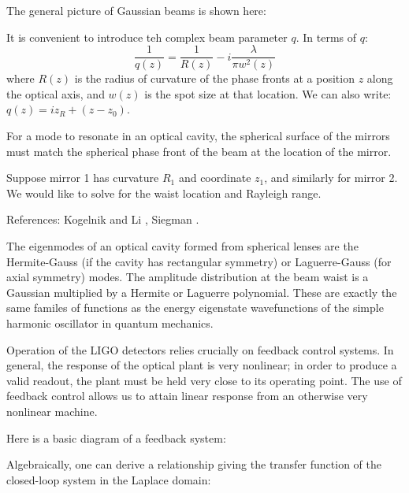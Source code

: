 



The general picture of Gaussian beams is shown here:

It is convenient to introduce teh complex beam parameter $q$.  In terms of $q$:
\begin{equation}
\frac{1}{q(z)} = \frac{1}{R(z)} - i \frac{\lambda}{\pi w^2(z)}
\end{equation}
where $R(z)$ is the radius of curvature of the phase fronts at a
position $z$ along the optical axis, and $w(z)$ is the spot size at
that location.  We can also write:
$q(z) = i z_R + (z - z_0)$.

For a mode to resonate in an optical cavity, the spherical surface of
the mirrors must match the spherical phase front of the beam at the
location of the mirror.

Suppose mirror 1 has curvature $R_1$ and coordinate $z_1$, and
similarly for mirror 2.  We would like to solve for the waist location
and Rayleigh range.

References: Kogelnik and Li \cite{Kogelnik1966Laser}, Siegman \cite{Siegman1990Lasers}.


The eigenmodes of an optical cavity formed from spherical lenses are
the Hermite-Gauss (if the cavity has rectangular symmetry) or
Laguerre-Gauss (for axial symmetry) modes.  The amplitude distribution
at the beam waist is a Gaussian multiplied by a Hermite or Laguerre
polynomial.  These are exactly the same familes of functions as the
energy eigenstate wavefunctions of the simple harmonic oscillator in
quantum mechanics.


Operation of the LIGO detectors relies crucially on feedback control
systems.  In general, the response of the optical plant is very
nonlinear; in order to produce a valid readout, the plant must be held
very close to its operating point.  The use of feedback control allows
us to attain linear response from an otherwise very nonlinear machine.

Here is a basic diagram of a feedback system:

Algebraically, one can derive a relationship giving the transfer function
of the closed-loop system in the Laplace domain:

